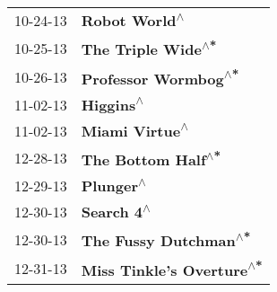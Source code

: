 \begin{supertabular}{p{0.25\columnwidth}p{0.75\columnwidth}}
 10-24-13 &                  \textbf{Robot World\textsuperscript{$\wedge$}} \\
 10-25-13 &             \textbf{The Triple Wide\textsuperscript{$\wedge$*}} \\
 10-26-13 &           \textbf{Professor Wormbog\textsuperscript{$\wedge$*}} \\
 11-02-13 &                      \textbf{Higgins\textsuperscript{$\wedge$}} \\
 11-02-13 &                 \textbf{Miami Virtue\textsuperscript{$\wedge$}} \\
 12-28-13 &             \textbf{The Bottom Half\textsuperscript{$\wedge$*}} \\
 12-29-13 &                      \textbf{Plunger\textsuperscript{$\wedge$}} \\
 12-30-13 &                     \textbf{Search 4\textsuperscript{$\wedge$}} \\
 12-30-13 &          \textbf{The Fussy Dutchman\textsuperscript{$\wedge$*}} \\
 12-31-13 &      \textbf{Miss Tinkle's Overture\textsuperscript{$\wedge$*}} \\
\end{supertabular}
